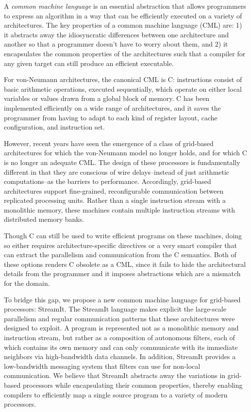 \documentclass{sig-alternate}
\begin{document}
A {\it common machine language} is an essential abstraction that
allows programmers to express an algorithm in a way that can be
efficiently executed on a variety of architectures.  The key
properties of a common machine language (CML) are: 1) it abstracts
away the idiosyncratic differences between one architecture and
another so that a programmer doesn't have to worry about them, and 2)
it encapsulates the common properties of the architectures such that a
compiler for any given target can still produce an efficient
executable.

For von-Neumann architectures, the canonical CML is C: instructions
consist of basic arithmetic operations, executed sequentially, which
operate on either local variables or values drawn from a global block
of memory.  C has been implemented efficiently on a wide range of
architectures, and it saves the programmer from having to adapt to
each kind of register layout, cache configuration, and instruction
set.

However, recent years have seen the emergence of a class of grid-based
architectures \cite{smartmemories, trips, raw} for which the
von-Neumann model no longer holds, and for which C is no longer an
adequate CML.  The design of these processors is fundamentally
different in that they are conscious of wire delays--instead of just
arithmetic computations--as the barriers to performance.  Accordingly,
grid-based architectures support fine-grained, reconfigurable
communication between replicated processing units.  Rather than a
single instruction stream with a monolithic memory, these machines
contain multiple instruction streams with distributed memory banks.

Though C can still be used to write efficient programs on these
machines, doing so either requires architecture-specific directives or
a very smart compiler that can extract the parallelism and
communication from the C semantics.  Both of these options renders C
obsolete as a CML, since it fails to hide the architectural details
from the programmer and it imposes abstractions which are a mismatch
for the domain.

To bridge this gap, we propose a new common machine language for
grid-based processors: StreamIt.  The StreamIt language makes explicit
the large-scale parallelism and regular communication patterns that
these architectures were designed to exploit.  A program is
represented not as a monolithic memory and instruction stream, but
rather as a composition of autonomous filters, each of which contains
its own memory and can only communicate with its immediate neighbors
via high-bandwidth data channels.  In addition, StreamIt provides a
low-bandwidth messaging system that filters can use for non-local
communication.  We believe that StreamIt abstracts away the variations
in grid-based processors while encapsulating their common properties,
thereby enabling compilers to efficiently map a single source program
to a variety of modern processors.
\end{document}
